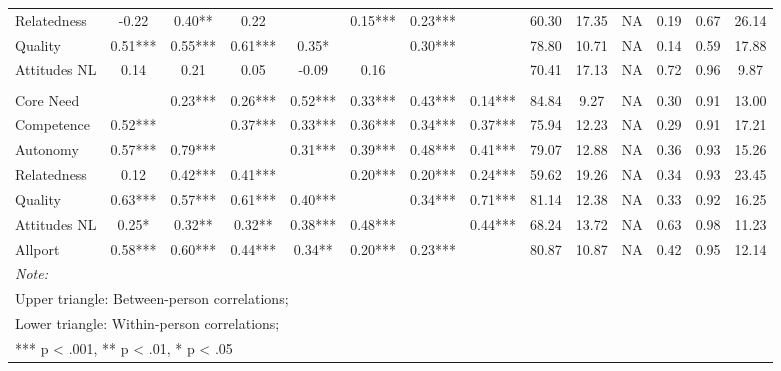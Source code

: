 \begin{table}
\begin{minipage}[t][\textheight][t]{\textwidth}
{\begin{tabular}[t]{lccccccccccccc}
\hspace{1em}Relatedness & -0.22 & 0.40** & 0.22 &  & 0.15*** & 0.23*** &  & 60.30 & 17.35 & NA & 0.19 & 0.67 & 26.14\\
\hspace{1em}Quality & 0.51*** & 0.55*** & 0.61*** & 0.35* &  & 0.30*** &  & 78.80 & 10.71 & NA & 0.14 & 0.59 & 17.88\\
\hspace{1em}Attitudes NL & 0.14 & 0.21 & 0.05 & -0.09 & 0.16 &  &  & 70.41 & 17.13 & NA & 0.72 & 0.96 & 9.87\\
\addlinespace[0.3em]
\multicolumn{14}{l}{\textbf{Study 3}}\\
\hspace{1em}Core Need &  & 0.23*** & 0.26*** & 0.52*** & 0.33*** & 0.43*** & 0.14*** & 84.84 & 9.27 & NA & 0.30 & 0.91 & 13.00\\
\hspace{1em}Competence & 0.52*** &  & 0.37*** & 0.33*** & 0.36*** & 0.34*** & 0.37*** & 75.94 & 12.23 & NA & 0.29 & 0.91 & 17.21\\
\hspace{1em}Autonomy & 0.57*** & 0.79*** &  & 0.31*** & 0.39*** & 0.48*** & 0.41*** & 79.07 & 12.88 & NA & 0.36 & 0.93 & 15.26\\
\hspace{1em}Relatedness & 0.12 & 0.42*** & 0.41*** &  & 0.20*** & 0.20*** & 0.24*** & 59.62 & 19.26 & NA & 0.34 & 0.93 & 23.45\\
\hspace{1em}Quality & 0.63*** & 0.57*** & 0.61*** & 0.40*** &  & 0.34*** & 0.71*** & 81.14 & 12.38 & NA & 0.33 & 0.92 & 16.25\\
\hspace{1em}Attitudes NL & 0.25* & 0.32** & 0.32** & 0.38*** & 0.48*** &  & 0.44*** & 68.24 & 13.72 & NA & 0.63 & 0.98 & 11.23\\
\hspace{1em}Allport & 0.58*** & 0.60*** & 0.44*** & 0.34** & 0.20*** & 0.23*** &  & 80.87 & 10.87 & NA & 0.42 & 0.95 & 12.14\\
\bottomrule
\multicolumn{14}{l}{\rule{0pt}{1em}\textit{Note: }}\\
\multicolumn{14}{l}{\rule{0pt}{1em}Upper triangle: Between-person correlations;}\\
\multicolumn{14}{l}{\rule{0pt}{1em}Lower triangle: Within-person correlations;}\\
\multicolumn{14}{l}{\rule{0pt}{1em}*** p < .001, ** p < .01,  * p < .05}\\
\end{tabular}}
\end{minipage}
\end{table}
